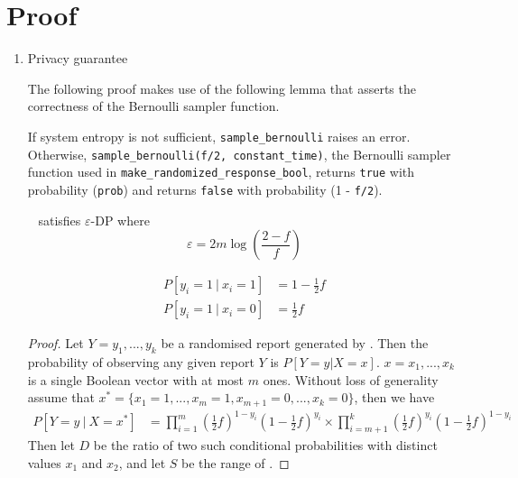 \documentclass{article}
\begin{document}
\section{Proof}
\begin{enumerate}
	\item Privacy guarantee
\begin{tcolorbox}
\begin{note}
The following proof makes use of the following lemma that asserts the correctness of the Bernoulli sampler function.
    \begin{lemma}
    If system entropy is not sufficient, \texttt{sample\_bernoulli} raises an error. 
    Otherwise, \texttt{sample\_bernoulli(f/2, constant\_time)}, the Bernoulli sampler function used in \texttt{make\_randomized\_response\_bool}, 
    returns \texttt{true} with probability (\texttt{prob}) and returns  \texttt{false} with probability (1 - \texttt{f/2}).
    \end{lemma}
\end{note}
\end{tcolorbox}
\begin{theorem}~\cite{rappor}
	 satisfies $\varepsilon$-DP where 
	\begin{equation}
		\varepsilon = 2m\log\left(\frac{2-f}{f}\right)
	\end{equation}
\end{theorem}
\begin{lemma}
	\begin{align}
		P[y_i = 1~|~x_i=1] &= 1 - \frac{1}{2}f\\
		P[y_i = 1~|~x_i=0] &=\frac{1}{2}f
	\end{align}
\end{lemma}
\begin{proof}
	Let $Y=y_1,...,y_k$ be a randomised report generated by . Then the probability of observing any given report $Y$ is $P[Y=y | X=x]$. $x=x_1,...,x_k$ is a single Boolean vector with at most $m$ ones. 
	Without loss of generality assume that $x^*=\{x_1=1,...,x_m=1,x_{m+1}=0,...,x_k=0\}$, then we have
	\begin{align}
		P[Y=y~|~X=x^*] &=%
			\prod\limits_{i=1}^m \left(\frac{1}{2}f\right)^{1-y_i}\left(1-\frac{1}{2}f\right)^{y_i}%
			\times \prod\limits_{i=m+1}^k\left(\frac{1}{2}f\right)^{y_i} \left(1-\frac{1}{2}f\right)^{1-y_i}
	\end{align}
	Then let $D$ be the ratio of two such conditional probabilities with distinct values $x_1$ and $x_2$, and let $S$ be the range of .

\end{proof}
\end{enumerate}
\end{document}

